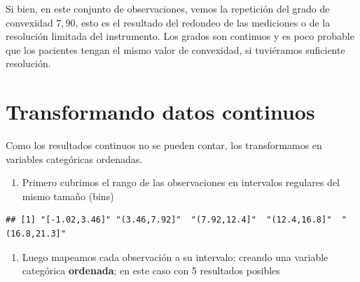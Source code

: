 \documentclass[
]{book}
\providecommand{\tightlist}{%
  \setlength{\itemsep}{0pt}\setlength{\parskip}{0pt}}
\begin{document}
Si bien, en este conjunto de observaciones, vemos la repetición del grado de convexidad \(7,90\), esto es el resultado del redondeo de las mediciones o de la resolución limitada del instrumento. Los grados son continuos y es poco probable que los pacientes tengan el mismo valor de convexidad, si tuviéramos suficiente resolución.

\hypertarget{transformando-datos-continuos}{%
\section{Transformando datos continuos}\label{transformando-datos-continuos}}

Como los resultados continuos no se pueden contar, los transformamos en variables categóricas ordenadas.

\begin{enumerate}
\def\labelenumi{\arabic{enumi})}
\tightlist
\item
  Primero cubrimos el rango de las observaciones en intervalos regulares del mismo tamaño (bins)
\end{enumerate}

\begin{verbatim}
## [1] "[-1.02,3.46]" "(3.46,7.92]"  "(7.92,12.4]"  "(12.4,16.8]"  "(16.8,21.3]"
\end{verbatim}

\begin{enumerate}
\def\labelenumi{\arabic{enumi})}
\setcounter{enumi}{1}
\tightlist
\item
  Luego mapeamos cada observación a su intervalo: creando una variable categórica \textbf{ordenada}; en este caso con 5 resultados posibles
\end{enumerate}
\end{document}
